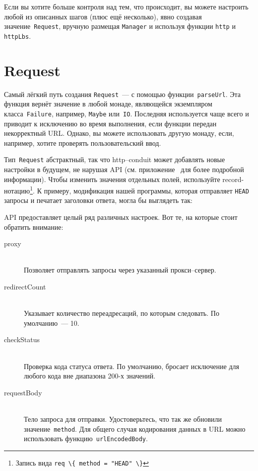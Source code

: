 Если вы хотите больше контроля над тем, что происходит, вы можете настроить
любой из описанных шагов (плюс ещё несколько), явно создавая
значение~\lstinline!Request!, вручную размещая \lstinline!Manager! и используя
функции \lstinline!http! и \lstinline!httpLbs!.

\section{Request}
Самый лёгкий путь создания \lstinline!Request!~--- с помощью
функции~\lstinline!parseUrl!. Эта функция вернёт значение в любой монаде,
являющейся экземпляром класса~\lstinline!Failure!, например, \lstinline!Maybe!
или~\lstinline!IO!. Последняя используется чаще всего и приводит к исключению
во время выполнения, если функции передан некорректный URL. Однако, вы можете
использовать другую монаду, если, например, хотите проверять пользовательский
ввод.


Тип~\lstinline!Request! абстрактный, так что http--conduit может добавлять
новые настройки в будущем, не нарушая API (см.
приложение~ для более подробной информации). Чтобы
изменить значения отдельных полей, используйте record-нотацию\footnote{Запись
    вида \lstinline'req \{ method = "HEAD" \}'}. К примеру, модификация нашей
программы, которая отправляет \texttt{HEAD} запросы и печатает заголовки
ответа, могла бы выглядеть так:


API предоставляет целый ряд различных настроек. Вот те, на которые стоит
обратить внимание:
\begin{description}
    \item[proxy] \hfill \\
    Позволяет отправлять запросы через указанный прокси--сервер.

    \item[redirectCount] \hfill \\
    Указывает количество переадресаций, по которым следовать. По умолчанию~---
    10.

    \item[checkStatus] \hfill \\
    Проверка кода статуса ответа. По умолчанию, бросает исключение для любого
    кода вне диапазона 200-х значений.

    \item[requestBody] \hfill \\
    Тело запроса для отправки. Удостоверьтесь, что так же обновили
    значение~\lstinline!method!. Для общего случая кодирования данных в URL
    можно использовать функцию~\lstinline!urlEncodedBody!.
\end{description}

